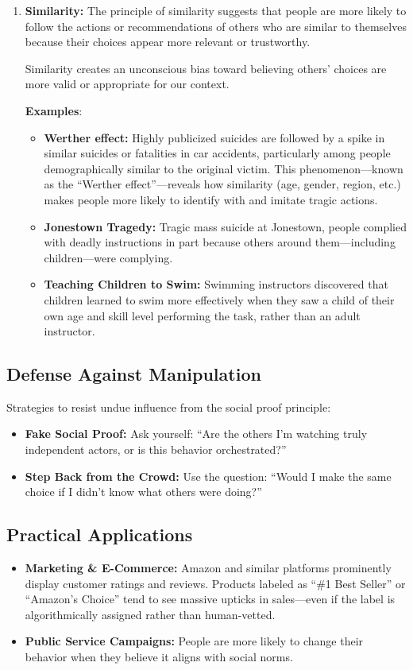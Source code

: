 \begin{enumerate}
    \item \textbf{Similarity:} The principle of similarity suggests that people are more likely to follow the actions or recommendations of others who are similar to themselves because their choices appear more relevant or trustworthy.
    
    Similarity creates an unconscious bias toward believing others' choices are more valid or appropriate for our context.    
    
    \textbf{Examples}:
    \begin{itemize}
        \item \textbf{Werther effect:} Highly publicized suicides are followed by a spike in similar suicides or fatalities in car accidents, particularly among people demographically similar to the original victim. This phenomenon—known as the “Werther effect”—reveals how similarity (age, gender, region, etc.) makes people more likely to identify with and imitate tragic actions.
        \item \textbf{Jonestown Tragedy:} Tragic mass suicide at Jonestown, people complied with deadly instructions in part because others around them—including children—were complying.
        \item \textbf{Teaching Children to Swim:} Swimming instructors discovered that children learned to swim more effectively when they saw a child of their own age and skill level performing the task, rather than an adult instructor. 
    \end{itemize}
\end{enumerate}


\subsection*{Defense Against Manipulation}
Strategies to resist undue influence from the social proof principle:
\begin{itemize}
    \item \textbf{Fake Social Proof:} Ask yourself: “Are the others I’m watching truly independent actors, or is this behavior orchestrated?”
    \item \textbf{Step Back from the Crowd:} Use the question: “Would I make the same choice if I didn’t know what others were doing?”
\end{itemize}

\subsection*{Practical Applications}
\begin{itemize}
    \item \textbf{Marketing \& E-Commerce:} Amazon and similar platforms prominently display customer ratings and reviews. Products labeled as ``\#1 Best Seller'' or ``Amazon's Choice'' tend to see massive upticks in sales—even if the label is algorithmically assigned rather than human-vetted.
    \item \textbf{Public Service Campaigns:} People are more likely to change their behavior when they believe it aligns with social norms.
\end{itemize}
